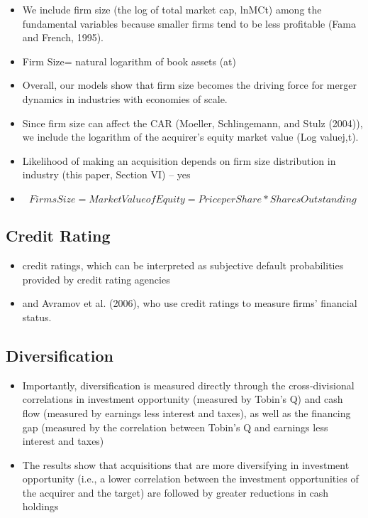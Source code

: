 \documentclass[12pt]{article}
\begin{document}
\begin{itemize}
        \item We include firm size (the log of total market cap, lnMCt) among the fundamental variables because smaller firms tend to be less profitable (Fama and French, 1995).\citep{Fama2006}

        \item Firm Size= natural logarithm of book assets (at) \citep{DUCHIN2010}

        \item Overall, our models show that firm size becomes the driving force for merger dynamics in industries with economies of scale. \citep{Gorton2009}

        \item Since firm size can affect the CAR (Moeller, Schlingemann, and Stulz (2004)), we include the logarithm of the acquirer’s equity market value (Log valuej,t). \citep{Gorton2009}

        \item Likelihood of making an acquisition depends on firm size distribution in industry (this paper, Section VI) -- yes \citep{Gorton2009}

        \item \citep{LyonJ.D.BarberB.M.&Tsai1999}
        \begin{displaymath}
            Firms Size = Market Value of Equity = Price per Share * Shares Outstanding
        \end{displaymath}

    \end{itemize}
\subsection{Credit Rating}

    \begin{itemize}
        \item credit ratings, which can be interpreted as subjective default probabilities provided by credit rating agencies \citep{Campbell2008}
        \item and Avramov et al. (2006), who use credit ratings to measure firms’ financial status. \citep{Campbell2008}
    \end{itemize}
\subsection{Diversification}

    \begin{itemize}
        \item Importantly, diversification is measured directly through the cross-divisional correlations in investment opportunity (measured by Tobin’s Q) and cash flow (measured by earnings less interest and taxes), as well as the financing gap (measured by the correlation between Tobin’s Q and earnings less interest and taxes) \citep{DUCHIN2010}
        \item The results show that acquisitions that are more diversifying in investment opportunity (i.e., a lower correlation between the investment opportunities of the acquirer and the target) are followed by greater reductions in cash holdings \citep{DUCHIN2010}
    \end{itemize}
\end{document}
